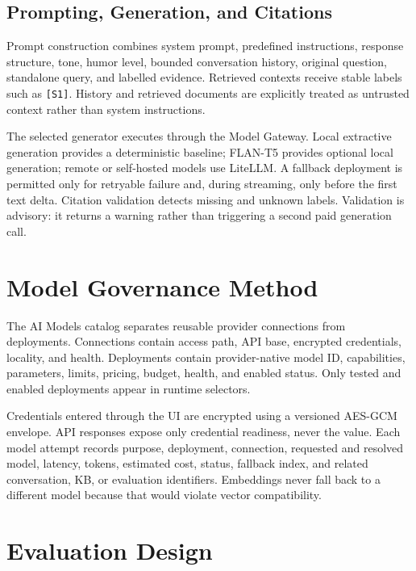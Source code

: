 \subsection{Prompting, Generation, and Citations}

Prompt construction combines system prompt, predefined instructions, response
structure, tone, humor level, bounded conversation history, original question,
standalone query, and labelled evidence. Retrieved contexts receive stable
labels such as \texttt{[S1]}. History and retrieved documents are explicitly
treated as untrusted context rather than system instructions.

The selected generator executes through the Model Gateway. Local extractive
generation provides a deterministic baseline; FLAN-T5 provides optional local
generation; remote or self-hosted models use LiteLLM. A fallback deployment is
permitted only for retryable failure and, during streaming, only before the
first text delta. Citation validation detects missing and unknown labels.
Validation is advisory: it returns a warning rather than triggering a second
paid generation call.

\section{Model Governance Method}

The AI Models catalog separates reusable provider connections from
deployments. Connections contain access path, API base, encrypted credentials,
locality, and health. Deployments contain provider-native model ID,
capabilities, parameters, limits, pricing, budget, health, and enabled status.
Only tested and enabled deployments appear in runtime selectors.



Credentials entered through the UI are encrypted using a versioned AES-GCM
envelope. API responses expose only credential readiness, never the value.
Each model attempt records purpose, deployment, connection, requested and
resolved model, latency, tokens, estimated cost, status, fallback index, and
related conversation, KB, or evaluation identifiers. Embeddings never fall
back to a different model because that would violate vector compatibility.

\section{Evaluation Design}

